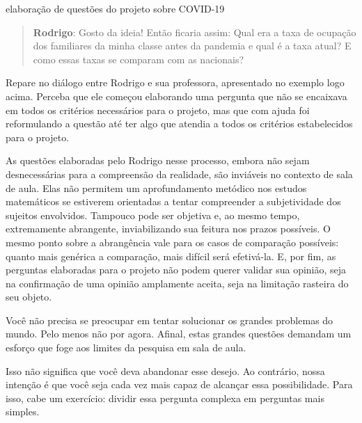 \begin{task}{elaboração de questões do projeto sobre COVID-19}
\begin{quote}
\textbf{Rodrigo}: Gosto da ideia! Então ficaria assim: Qual era a taxa de ocupação dos familiares da minha classe antes da pandemia e qual é a taxa atual? E como essas taxas se comparam com as nacionais?

\end{quote}

Repare no diálogo entre Rodrigo e sua professora, apresentado no exemplo logo acima. Perceba que ele começou elaborando uma pergunta que não se encaixava em todos os critérios necessários para o projeto, mas que com ajuda foi reformulando a questão até ter algo que atendia a todos os critérios estabelecidos para o projeto.

As questões elaboradas pelo Rodrigo nesse processo, embora não sejam desnecessárias para a compreensão da realidade, são inviáveis no contexto de sala de aula. Elas não permitem um aprofundamento metódico nos estudos matemáticos se estiverem orientadas a tentar compreender a subjetividade dos sujeitos envolvidos. Tampouco pode ser objetiva e, ao mesmo tempo, extremamente abrangente, inviabilizando sua feitura nos prazos possíveis. O mesmo ponto sobre a abrangência vale para os casos de comparação possíveis: quanto mais genérica a comparação, mais difícil será efetivá-la. E, por fim, as perguntas elaboradas para o projeto não podem querer validar sua opinião, seja na confirmação de uma opinião amplamente aceita, seja na limitação rasteira do seu objeto.

Você não precisa se preocupar em tentar solucionar os grandes problemas do mundo. Pelo menos não por agora. Afinal, estas grandes questões demandam um esforço que foge aos limites da pesquisa em sala de aula.

Isso não significa que você deva abandonar esse desejo. Ao contrário, nossa intenção é que você seja cada vez mais capaz de alcançar essa possibilidade. Para isso, cabe um exercício: dividir essa pergunta complexa em perguntas mais simples.

\end{task}


\label{etapa3}

